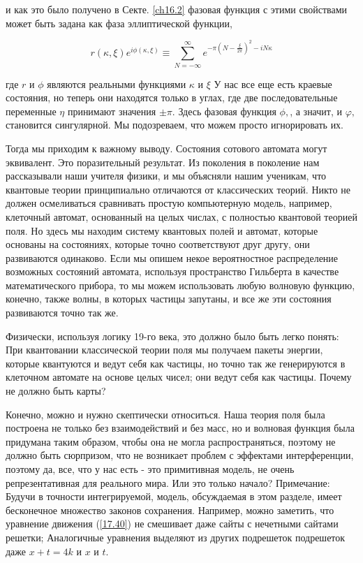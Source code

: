 \documentclass[main.tex]{subfiles}
\begin{document}
и как это было получено в Секте. \ref{ch16.2} фазовая функция с этими свойствами может быть задана как фаза эллиптической функции,

\begin{equation}\label{17.63}
r(\kappa, \xi) e^{i \phi(\kappa, \xi)} \equiv \sum_{N=-\infty}^{\infty} e^{-\pi\left(N-\frac{\xi}{2 \pi}\right)^{2}-i N \kappa}
\end{equation}

где $r$ и $\phi$ являются реальными функциями $\kappa$ и $\xi$ У нас все еще есть краевые состояния, но теперь они находятся только в углах, где две последовательные переменные $\eta$ принимают значения $\pm \pi .$ Здесь фазовая функция $\phi,$, а значит, и $\varphi,$ становится сингулярной. Мы подозреваем, что можем просто игнорировать их.

Тогда мы приходим к важному выводу. Состояния сотового автомата могут
эквивалент. Это поразительный результат. Из поколения в поколение нам рассказывали наши учителя физики, и мы объясняли нашим ученикам, что квантовые теории принципиально отличаются от классических теорий. Никто не должен осмеливаться сравнивать простую компьютерную модель, например, клеточный автомат, основанный на целых числах, с полностью квантовой теорией поля. Но здесь мы находим систему квантовых полей и автомат, которые основаны на состояниях, которые точно соответствуют друг другу, они развиваются одинаково. Если мы опишем некое вероятностное распределение возможных состояний автомата, используя пространство Гильберта в качестве математического прибора, то мы можем использовать любую волновую функцию, конечно, также волны, в которых частицы запутаны, и все же эти состояния развиваются точно так же.

Физически, используя логику 19-го века, это должно было быть легко понять:
При квантовании классической теории поля мы получаем пакеты энергии, которые квантуются и ведут себя как частицы, но точно так же генерируются в клеточном автомате на основе целых чисел; они ведут себя как частицы. Почему не должно быть карты?

Конечно, можно и нужно скептически относиться. Наша теория поля была построена не только без взаимодействий и без масс, но и волновая функция была придумана таким образом, чтобы она не могла распространяться, поэтому не должно быть сюрпризом, что не возникает проблем с эффектами интерференции, поэтому да, все, что у нас есть - это примитивная модель, не очень репрезентативная для реального мира. Или это только начало?
Примечание: Будучи в точности интегрируемой, модель, обсуждаемая в этом разделе, имеет бесконечное множество законов сохранения. Например, можно заметить, что уравнение движения (\ref{17.40}) не смешивает даже сайты с нечетными сайтами решетки; Аналогичные уравнения выделяют из других подрешеток подрешеток даже $x+t=4 k$ и $x$ и $t$.
\end{document}
